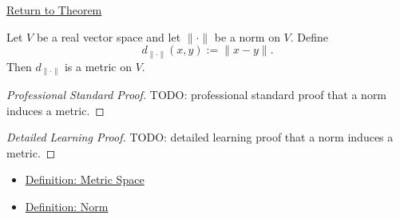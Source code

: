 \newpage
{}
\label{prf:norm-induces-metric}

\begin{remark*}[Return]
\hyperref[thm:norm-induces-metric]{Return to Theorem}
\end{remark*}

\begin{theorem*}
Let \(V\) be a real vector space and let \(\|\cdot\|\) be a norm on \(V\).
Define
\[
  d_{\|\cdot\|}(x,y):=\|x-y\|.
\]
Then \(d_{\|\cdot\|}\) is a metric on \(V\).
\end{theorem*}

\begin{proof}[Professional Standard Proof]
\LRAProofBodyStart
TODO: professional standard proof that a norm induces a metric.
\end{proof}

\begin{proof}[Detailed Learning Proof]
\LRAProofBodyStart
TODO: detailed learning proof that a norm induces a metric.
\end{proof}

\begin{remark*}
\end{remark*}

\begin{dependencies}
\begin{itemize}
  \item \hyperref[def:metric-space]{Definition: Metric Space}
  \item \hyperref[def:norm-on-real-vector-space]{Definition: Norm}
\end{itemize}
\end{dependencies}

\clearpage
